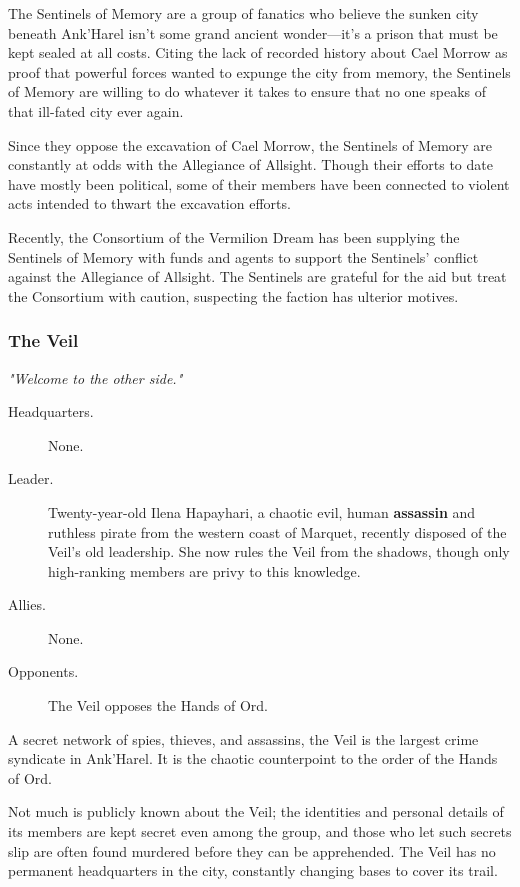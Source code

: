 \documentclass[10pt,a4paper,twoside,fancy,bg=print,twocolumn,openany,nodeprecatedcode]{dndbook}
\begin{document}
The Sentinels of Memory are a group of fanatics who believe the sunken city beneath Ank'Harel isn't some grand ancient wonder—it's a prison that must be kept sealed at all costs. Citing the lack of recorded history about Cael Morrow as proof that powerful forces wanted to expunge the city from memory, the Sentinels of Memory are willing to do whatever it takes to ensure that no one speaks of that ill-fated city ever again.

Since they oppose the excavation of Cael Morrow, the Sentinels of Memory are constantly at odds with the Allegiance of Allsight. Though their efforts to date have mostly been political, some of their members have been connected to violent acts intended to thwart the excavation efforts.

Recently, the Consortium of the Vermilion Dream has been supplying the Sentinels of Memory with funds and agents to support the Sentinels' conflict against the Allegiance of Allsight. The Sentinels are grateful for the aid but treat the Consortium with caution, suspecting the faction has ulterior motives.

\subsubsection{The Veil}
\textit{"Welcome to the other side."}


\begin{description}
\item[Headquarters.]
None.
\item[Leader.]
Twenty-year-old Ilena Hapayhari, a chaotic evil, human \textbf{assassin} and ruthless pirate from the western coast of Marquet, recently disposed of the Veil's old leadership. She now rules the Veil from the shadows, though only high-ranking members are privy to this knowledge.
\item[Allies.]
None.
\item[Opponents.]
The Veil opposes the Hands of Ord.
\end{description}

A secret network of spies, thieves, and assassins, the Veil is the largest crime syndicate in Ank'Harel. It is the chaotic counterpoint to the order of the Hands of Ord.

Not much is publicly known about the Veil; the identities and personal details of its members are kept secret even among the group, and those who let such secrets slip are often found murdered before they can be apprehended. The Veil has no permanent headquarters in the city, constantly changing bases to cover its trail.
\end{document}
